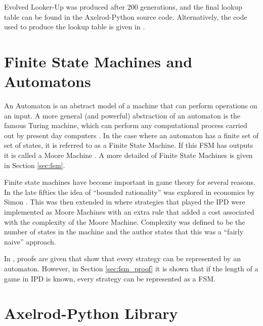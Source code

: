 Evolved Looker-Up was produced after 200 generations, and the final lookup table can be found in the Axelrod-Python source code.
Alternatively, the code used to produce the lookup table is given in \cite{axelrod-evolver}.

\section{Finite State Machines and Automatons}
An Automaton is an abstract model of a machine that can perform operations on an input.
A more general (and powerful) abstraction of an automaton is the famous Turing machine, which can perform any computational process carried out by present day computers \cite{Kandar2013}.
In the case where an automaton has a finite set of set of states, it is referred to as a Finite State Machine.
If this FSM has outputs it is called a Moore Machine \cite{Ndjountche2016}.
A more detailed of Finite State Machines is given in Section \ref{sec:fsm}.

Finite state machines have become important in game theory for several reasons.
In the late fifties the idea of ``bounded rationality'' was explored in economics by Simon \cite{Simon1972}.
This was then extended in \cite{Rubinstein1986} where strategies that played the IPD were implemented as Moore Machines with an extra rule that added a cost associated with the complexity of the Moore Machine.
Complexity was defined to be the number of states in the machine and the author states that this was a ``fairly naive'' approach.

In \cite{Kalai1986, Kalai1988}, proofs are given that show that every strategy can be represented by an automaton.
However, in Section \ref{sec:fsm_proof} it is shown that if the length of a game in IPD is known, every strategy can be represented as a FSM.


\section{Axelrod-Python Library}

